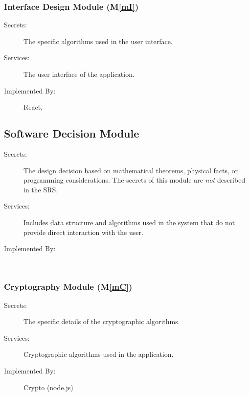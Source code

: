 \documentclass[12pt, titlepage]{article}
\newcommand{\mref}[1]{M\ref{#1}}
\begin{document}
\subsubsection{Interface Design Module (\mref{mI})}
\begin{description}
\item[Secrets:] The specific algorithms used in the user interface.
\item[Services:] The user interface of the application.
\item[Implemented By:]  React, \progname{}
\end{description}



\subsection{Software Decision Module}

\begin{description}
\item[Secrets:] The design decision based on mathematical theorems, physical
  facts, or programming considerations. The secrets of this module are
  \emph{not} described in the SRS.
\item[Services:] Includes data structure and algorithms used in the system that
  do not provide direct interaction with the user. 
\item[Implemented By:] --
\end{description}

\subsubsection{Cryptography Module (\mref{mC})}
\begin{description}
\item[Secrets:] The specific details of the cryptographic algorithms.
\item[Services:] Cryptographic algorithms used in the application. 
\item[Implemented By:] Crypto (node.js)
\end{description}
\end{document}
